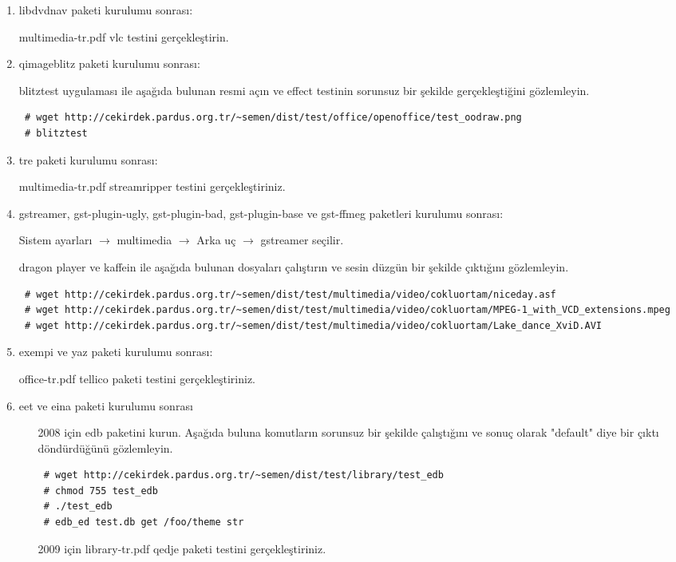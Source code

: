 \documentclass[a4paper,10pt]{article}
\begin{document}
\begin{enumerate}
\item libdvdnav paketi kurulumu sonrası:

multimedia-tr.pdf vlc testini gerçekleştirin.

\item qimageblitz paketi kurulumu sonrası:

blitztest uygulaması ile aşağıda bulunan resmi açın ve effect testinin sorunsuz bir şekilde gerçekleştiğini gözlemleyin.
\begin{verbatim}
 # wget http://cekirdek.pardus.org.tr/~semen/dist/test/office/openoffice/test_oodraw.png
 # blitztest
\end{verbatim}


\item tre paketi kurulumu sonrası:

multimedia-tr.pdf streamripper testini gerçekleştiriniz.

\item gstreamer, gst-plugin-ugly, gst-plugin-bad, gst-plugin-base ve gst-ffmeg paketleri kurulumu sonrası:

Sistem ayarları $\rightarrow$ multimedia $\rightarrow$ Arka uç $\rightarrow$ gstreamer seçilir. 

dragon player ve kaffein ile aşağıda bulunan dosyaları çalıştırın ve sesin düzgün bir şekilde çıktığını gözlemleyin.
\begin{verbatim}
 # wget http://cekirdek.pardus.org.tr/~semen/dist/test/multimedia/video/cokluortam/niceday.asf
 # wget http://cekirdek.pardus.org.tr/~semen/dist/test/multimedia/video/cokluortam/MPEG-1_with_VCD_extensions.mpeg
 # wget http://cekirdek.pardus.org.tr/~semen/dist/test/multimedia/video/cokluortam/Lake_dance_XviD.AVI
\end{verbatim}

\item exempi ve yaz paketi kurulumu sonrası:

office-tr.pdf tellico paketi testini gerçekleştiriniz.

\item eet ve eina paketi kurulumu sonrası
\begin{itemize}
 \item [2008 için] edb paketini kurun. Aşağıda buluna komutların sorunsuz bir şekilde çalıştığını ve sonuç olarak "default" diye bir çıktı döndürdüğünü gözlemleyin.
\begin{verbatim}
 # wget http://cekirdek.pardus.org.tr/~semen/dist/test/library/test_edb
 # chmod 755 test_edb
 # ./test_edb
 # edb_ed test.db get /foo/theme str
\end{verbatim}
\item [2009 için] library-tr.pdf qedje paketi testini gerçekleştiriniz.
\end{itemize}


\end{enumerate}
\end{document}
